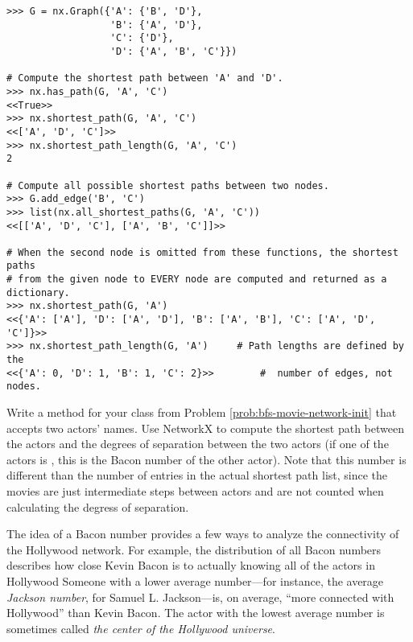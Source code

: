 \begin{lstlisting}
>>> G = nx.Graph({'A': {'B', 'D'},
                  'B': {'A', 'D'},
                  'C': {'D'},
                  'D': {'A', 'B', 'C'}})

# Compute the shortest path between 'A' and 'D'.
>>> nx.has_path(G, 'A', 'C')
<<True>>
>>> nx.shortest_path(G, 'A', 'C')
<<['A', 'D', 'C']>>
>>> nx.shortest_path_length(G, 'A', 'C')
2

# Compute all possible shortest paths between two nodes.
>>> G.add_edge('B', 'C')
>>> list(nx.all_shortest_paths(G, 'A', 'C'))
<<[['A', 'D', 'C'], ['A', 'B', 'C']]>>

# When the second node is omitted from these functions, the shortest paths
# from the given node to EVERY node are computed and returned as a dictionary.
>>> nx.shortest_path(G, 'A')
<<{'A': ['A'], 'D': ['A', 'D'], 'B': ['A', 'B'], 'C': ['A', 'D', 'C']}>>
>>> nx.shortest_path_length(G, 'A')     # Path lengths are defined by the
<<{'A': 0, 'D': 1, 'B': 1, 'C': 2}>>        #  number of edges, not nodes.
\end{lstlisting}

\begin{problem} %
Write a method for your class from Problem \ref{prob:bfs-movie-network-init} that accepts two actors' names.
Use NetworkX to compute the shortest path between the actors and the degrees of separation between the two actors (if one of the actors is , this is the Bacon number of the other actor).
Note that this number is different than the number of entries in the actual shortest path list, since the movies are just intermediate steps between actors and are not counted when calculating the degress of separation.
\label{prob:bfs-actor-path}
\end{problem}

The idea of a Bacon number provides a few ways to analyze the connectivity of the Hollywood network.
For example, the distribution of all Bacon numbers describes how close Kevin Bacon is to actually knowing all of the actors in Hollywood
Someone with a lower average number---for instance, the average \emph{Jackson number}, for Samuel L. Jackson---is, on average, ``more connected with Hollywood'' than Kevin Bacon.
The actor with the lowest average number is sometimes called \emph{the center of the Hollywood universe}.

